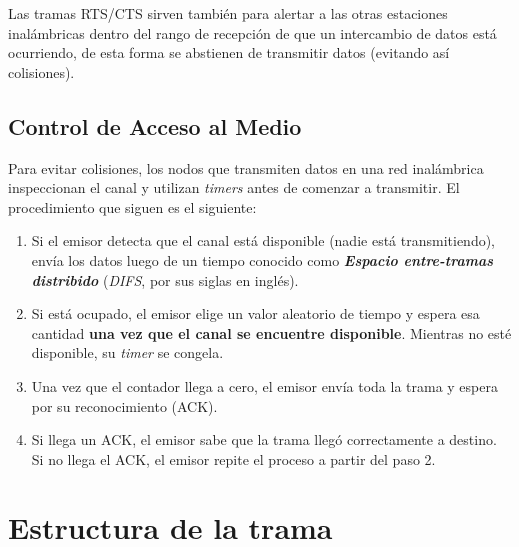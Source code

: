 Las tramas RTS/CTS sirven también para alertar a las otras estaciones inalámbricas dentro del rango de recepción de que un intercambio de datos está ocurriendo, de esta forma se abstienen de transmitir datos (evitando así colisiones).

\subsection{Control de Acceso al Medio}

Para evitar colisiones, los nodos que transmiten datos en una red inalámbrica inspeccionan el canal y utilizan \emph{timers} antes de comenzar a transmitir. El procedimiento que siguen es el siguiente:

\begin{enumerate}
    \item Si el emisor detecta que el canal está disponible (nadie está transmitiendo), envía los datos luego de un tiempo conocido como \emph{\textbf{Espacio entre-tramas distribido}} (\emph{DIFS}, por sus siglas en inglés).
    \item Si está ocupado, el emisor elige un valor aleatorio de tiempo y espera esa cantidad \textbf{una vez que el canal se encuentre disponible}. Mientras no esté disponible, su \emph{timer} se congela.
    \item Una vez que el contador llega a cero, el emisor envía toda la trama y espera por su reconocimiento (ACK).
    \item Si llega un ACK, el emisor sabe que la trama llegó correctamente a destino. Si no llega el ACK, el emisor repite el proceso a partir del paso 2.
\end{enumerate}

\section{Estructura de la trama}





















\clearpage
\printbibliography



